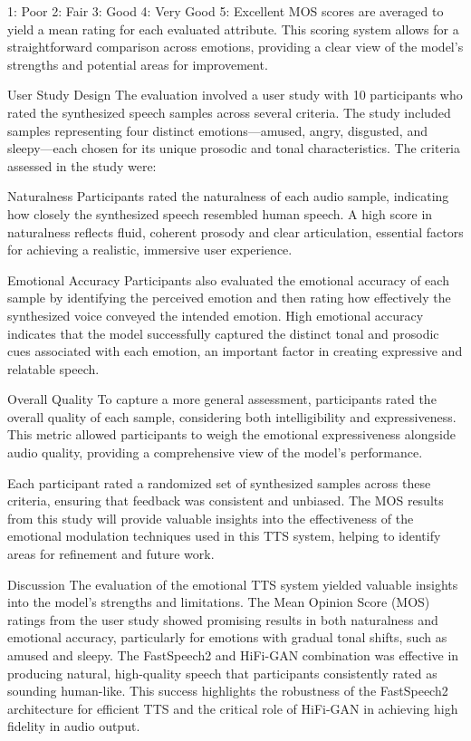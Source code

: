 1: Poor
2: Fair
3: Good
4: Very Good
5: Excellent
MOS scores are averaged to yield a mean rating for each evaluated attribute. This scoring system allows for a straightforward comparison across emotions, providing a clear view of the model’s strengths and potential areas for improvement.

User Study Design
The evaluation involved a user study with 10 participants who rated the synthesized speech samples across several criteria. The study included samples representing four distinct emotions—amused, angry, disgusted, and sleepy—each chosen for its unique prosodic and tonal characteristics. The criteria assessed in the study were:

Naturalness
Participants rated the naturalness of each audio sample, indicating how closely the synthesized speech resembled human speech. A high score in naturalness reflects fluid, coherent prosody and clear articulation, essential factors for achieving a realistic, immersive user experience.

Emotional Accuracy
Participants also evaluated the emotional accuracy of each sample by identifying the perceived emotion and then rating how effectively the synthesized voice conveyed the intended emotion. High emotional accuracy indicates that the model successfully captured the distinct tonal and prosodic cues associated with each emotion, an important factor in creating expressive and relatable speech.

Overall Quality
To capture a more general assessment, participants rated the overall quality of each sample, considering both intelligibility and expressiveness. This metric allowed participants to weigh the emotional expressiveness alongside audio quality, providing a comprehensive view of the model’s performance.

Each participant rated a randomized set of synthesized samples across these criteria, ensuring that feedback was consistent and unbiased. The MOS results from this study will provide valuable insights into the effectiveness of the emotional modulation techniques used in this TTS system, helping to identify areas for refinement and future work.

Discussion
The evaluation of the emotional TTS system yielded valuable insights into the model’s strengths and limitations. The Mean Opinion Score (MOS) ratings from the user study showed promising results in both naturalness and emotional accuracy, particularly for emotions with gradual tonal shifts, such as amused and sleepy. The FastSpeech2 and HiFi-GAN combination was effective in producing natural, high-quality speech that participants consistently rated as sounding human-like. This success highlights the robustness of the FastSpeech2 architecture for efficient TTS and the critical role of HiFi-GAN in achieving high fidelity in audio output.

